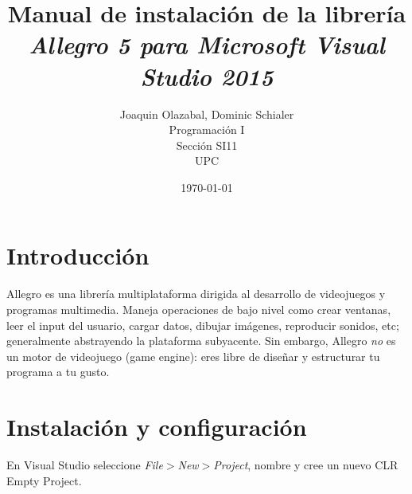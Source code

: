 \documentclass[11pt]{article}
\begin{document}
\title{Manual de instalación de la librería \it Allegro 5 \rm para \it Microsoft Visual Studio 2015}
\author{Joaquin Olazabal, Dominic Schialer\\
			Programación I\\
			Sección SI11\\
			UPC}
\date{\today}
\maketitle
\vspace{50mm}
\tableofcontents
\pagebreak
\section{Introducción}
Allegro es una librería multiplataforma dirigida al desarrollo de videojuegos y programas multimedia. Maneja operaciones de bajo nivel como crear ventanas, leer el input del usuario, cargar datos, dibujar imágenes, reproducir sonidos, etc; generalmente abstrayendo la plataforma subyacente.  Sin embargo, Allegro \emph{no} es un motor de videojuego (game engine): eres libre de diseñar y estructurar tu programa a tu gusto.

\section{Instalación y configuración}
En Visual Studio seleccione \emph{File$>$New$>$Project}, nombre y cree un nuevo CLR Empty Project.
\end{document}
